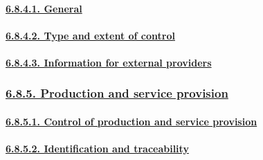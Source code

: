 \documentclass[
]{article}
\begin{document}
\hypertarget{general-5}{%
\paragraph{\texorpdfstring{\protect\hyperlink{general-14}{6.8.4.1.
General}}{6.8.4.1. General}}\label{general-5}}

\hypertarget{type-and-extent-of-control}{%
\paragraph{\texorpdfstring{\protect\hyperlink{type-and-extent-of-control-1}{6.8.4.2.
Type and extent of
control}}{6.8.4.2. Type and extent of control}}\label{type-and-extent-of-control}}

\hypertarget{information-for-external-providers}{%
\paragraph{\texorpdfstring{\protect\hyperlink{information-for-external-providers-1}{6.8.4.3.
Information for external
providers}}{6.8.4.3. Information for external providers}}\label{information-for-external-providers}}

\hypertarget{production-and-service-provision}{%
\subsubsection{\texorpdfstring{\protect\hyperlink{production-and-service-provision-1}{6.8.5.
Production and service
provision}}{6.8.5. Production and service provision}}\label{production-and-service-provision}}

\hypertarget{control-of-production-and-service-provision}{%
\paragraph{\texorpdfstring{\protect\hyperlink{control-of-production-and-service-provision-1}{6.8.5.1.
Control of production and service
provision}}{6.8.5.1. Control of production and service provision}}\label{control-of-production-and-service-provision}}

\hypertarget{identification-and-traceability}{%
\paragraph{\texorpdfstring{\protect\hyperlink{identification-and-traceability-1}{6.8.5.2.
Identification and
traceability}}{6.8.5.2. Identification and traceability}}\label{identification-and-traceability}}
\end{document}

